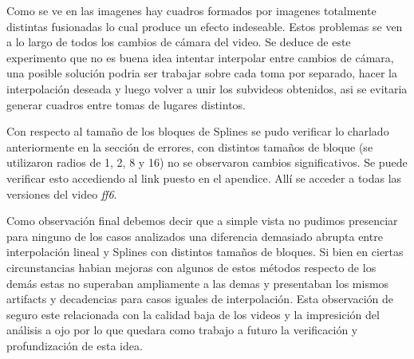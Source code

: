 Como se ve en las imagenes hay cuadros formados por imagenes totalmente distintas fusionadas lo cual produce un efecto indeseable. Estos problemas se ven a lo largo de todos los cambios de cámara del video. Se deduce de este experimento que no es buena idea intentar interpolar entre cambios de cámara, una posible solución podria ser trabajar sobre cada toma por separado, hacer la interpolación deseada y luego volver a unir los subvideos obtenidos, asi se evitaria generar cuadros entre tomas de lugares distintos.

Con respecto al tamaño de los bloques de Splines se pudo verificar lo charlado anteriormente en la sección de errores, con distintos tamaños de bloque (se utilizaron radios de 1, 2, 8 y 16) no se observaron cambios significativos. Se puede verificar esto accediendo al link puesto en el apendice. Allí se acceder a todas las versiones del video \textit{ff6}.


Como observación final debemos decir que a simple vista no pudimos presenciar para ninguno de los casos analizados una diferencia demasiado abrupta entre interpolación lineal y Splines con distintos tamaños de bloques. Si bien en ciertas circunstancias habian mejoras con algunos de estos métodos respecto de los demás estas no superaban ampliamente a las demas y presentaban los mismos artifacts y decadencias para casos iguales de interpolación. Esta observación de seguro este relacionada con la calidad baja de los videos y la impresición del análisis a ojo por lo que quedara como trabajo a futuro la verificación y profundización de esta idea.
